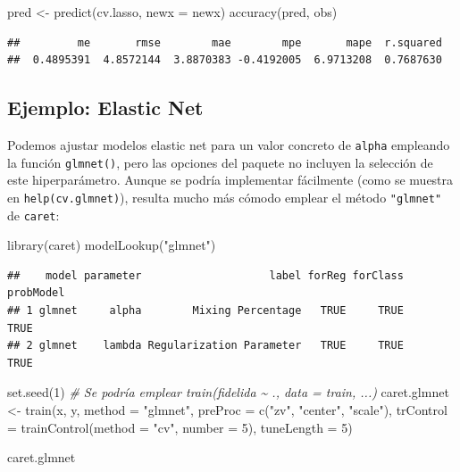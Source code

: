 \documentclass[
  spanish,
]{book}
\newenvironment{Shaded}{\begin{snugshade}}{\end{snugshade}}
\newcommand{\AttributeTok}[1]{\textcolor[rgb]{0.77,0.63,0.00}{#1}}
\newcommand{\CommentTok}[1]{\textcolor[rgb]{0.56,0.35,0.01}{\textit{#1}}}
\newcommand{\DecValTok}[1]{\textcolor[rgb]{0.00,0.00,0.81}{#1}}
\newcommand{\FunctionTok}[1]{\textcolor[rgb]{0.00,0.00,0.00}{#1}}
\newcommand{\NormalTok}[1]{#1}
\newcommand{\OtherTok}[1]{\textcolor[rgb]{0.56,0.35,0.01}{#1}}
\newcommand{\StringTok}[1]{\textcolor[rgb]{0.31,0.60,0.02}{#1}}
\theoremstyle{break}
\theoremstyle{definition}
\theoremstyle{definition}
\theoremstyle{definition}
\theoremstyle{definition}
\theoremstyle{remark}
\begin{document}
\begin{Shaded}
\begin{Highlighting}[]
\NormalTok{pred }\OtherTok{\textless{}{-}} \FunctionTok{predict}\NormalTok{(cv.lasso, }\AttributeTok{newx =}\NormalTok{ newx)}
\FunctionTok{accuracy}\NormalTok{(pred, obs)}
\end{Highlighting}
\end{Shaded}

\begin{verbatim}
##         me       rmse        mae        mpe       mape  r.squared 
##  0.4895391  4.8572144  3.8870383 -0.4192005  6.9713208  0.7687630
\end{verbatim}

\hypertarget{ejemplo-elastic-net}{%
\subsection{Ejemplo: Elastic Net}\label{ejemplo-elastic-net}}

Podemos ajustar modelos elastic net para un valor concreto de \texttt{alpha} empleando la función \texttt{glmnet()}, pero las opciones del paquete no incluyen la selección de este hiperparámetro.
Aunque se podría implementar fácilmente (como se muestra en \texttt{help(cv.glmnet)}), resulta mucho más cómodo emplear el método \texttt{"glmnet"} de \texttt{caret}:

\begin{Shaded}
\begin{Highlighting}[]
\FunctionTok{library}\NormalTok{(caret)}
\FunctionTok{modelLookup}\NormalTok{(}\StringTok{"glmnet"}\NormalTok{) }
\end{Highlighting}
\end{Shaded}

\begin{verbatim}
##    model parameter                    label forReg forClass probModel
## 1 glmnet     alpha        Mixing Percentage   TRUE     TRUE      TRUE
## 2 glmnet    lambda Regularization Parameter   TRUE     TRUE      TRUE
\end{verbatim}

\begin{Shaded}
\begin{Highlighting}[]
\FunctionTok{set.seed}\NormalTok{(}\DecValTok{1}\NormalTok{)}
\CommentTok{\# Se podría emplear train(fidelida \textasciitilde{} ., data = train, ...)}
\NormalTok{caret.glmnet }\OtherTok{\textless{}{-}} \FunctionTok{train}\NormalTok{(x, y, }\AttributeTok{method =} \StringTok{"glmnet"}\NormalTok{,}
    \AttributeTok{preProc =} \FunctionTok{c}\NormalTok{(}\StringTok{"zv"}\NormalTok{, }\StringTok{"center"}\NormalTok{, }\StringTok{"scale"}\NormalTok{),}
    \AttributeTok{trControl =} \FunctionTok{trainControl}\NormalTok{(}\AttributeTok{method =} \StringTok{"cv"}\NormalTok{, }\AttributeTok{number =} \DecValTok{5}\NormalTok{),}
    \AttributeTok{tuneLength =} \DecValTok{5}\NormalTok{)}


\NormalTok{caret.glmnet}
\end{Highlighting}
\end{Shaded}
\end{document}
